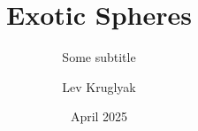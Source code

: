 \documentclass{lkx_thesis}
\title{Exotic Spheres}
\subtitle{Some subtitle}
\author{Lev Kruglyak}
\date{April 2025}
\begin{document}


\lkxtoc








% 
% 
% 

%
%
% 
% 
% 
%
%
% 
% 
% 
% 
%

% 
% 

\lkxrefs
\lkxindex
\end{document}
